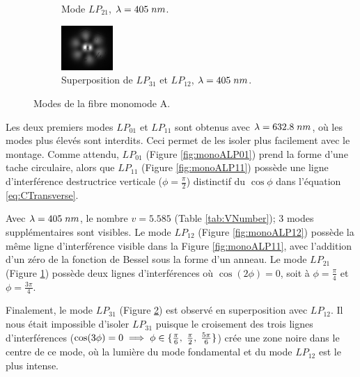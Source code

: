 \documentclass[10pt,letterpaper,twocolumn]{article}
\newcommand{\s}{\hspace{0.1cm}}
\begin{document}
\begin{figure}[H]
\begin{subfigure}[t]{0.3\linewidth}
		\caption{Mode $LP_{21}$, ${\lambda=405\s nm}$.}
		\label{fig:monoALP21}
	\end{subfigure}
	\begin{subfigure}[t]{0.3\linewidth}
		\includegraphics[height=1.7cm, width=\linewidth]{figures/A-LP31et12-mauve405.jpg}
		\caption{Superposition de $LP_{31}$ et $LP_{12}$, ${\lambda=405\s nm}$.}
		\label{fig:monoALP31et12}
	\end{subfigure}
	\caption{Modes de la fibre monomode A.}
	\label{fig:MONOA}
\end{figure}
Les deux premiers modes $LP_{01}$ et $LP_{11}$ sont obtenus avec $\lambda=632.8\s nm$, où les modes plus élevés sont interdits. Ceci permet de les isoler plus facilement avec le montage. Comme attendu, $LP_{01}$ (Figure \ref{fig:monoALP01}) prend la forme d'une tache circulaire, alors que $LP_{11}$ (Figure \ref{fig:monoALP11}) possède une ligne d'interférence destructrice verticale ($\phi=\frac{\pi}{2}$) distinctif du $\cos\phi$ dans l'équation \eqref{eq:CTransverse}. \par
Avec $\lambda=405\s nm$, le nombre $v=5.585$ (Table \ref{tab:VNumber}); 3 modes supplémentaires sont visibles. Le mode $LP_{12}$ (Figure \ref{fig:monoALP12}) possède la même ligne d'interférence visible dans la Figure \ref{fig:monoALP11}, avec l'addition d'un zéro de la fonction de Bessel sous la forme d'un anneau. Le mode $LP_{21}$ (Figure \ref{fig:monoALP21}) possède deux lignes d'interférences où $\cos(2\phi) = 0$, soit à $\phi=\frac{\pi}{4}$ et $\phi=\frac{3\pi}{4}$. \par
Finalement, le mode $LP_{31}$ (Figure \ref{fig:monoALP31et12}) est observé en superposition avec $LP_{12}$. Il nous était impossible d'isoler $LP_{31}$ puisque le croisement des trois lignes d'interférences ($\cos(3\phi)=0 \implies \phi \in \{\frac{\pi}{6},\s \frac{\pi}{2},\s \frac{5\pi}{6} \}$) crée une zone noire dans le centre de ce mode, où la lumière du mode fondamental et du mode $LP_{12}$ est le plus intense. \par
\end{document}
